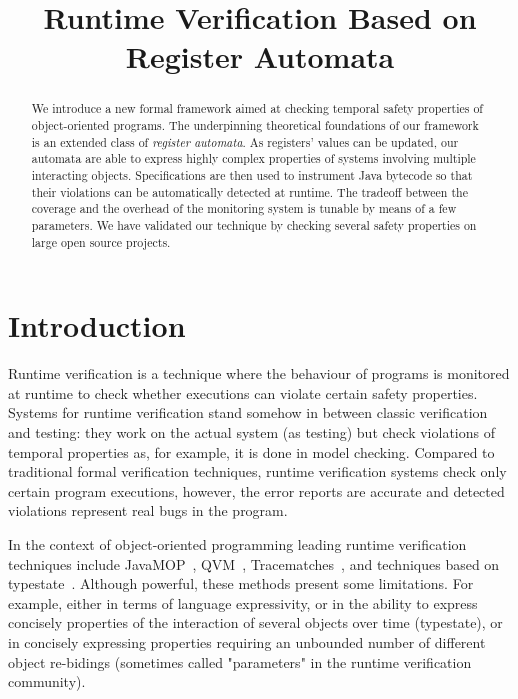 \documentclass[9pt, preprint]{sigplanconf} %
\title{Runtime Verification Based on Register Automata}
\theoremstyle{definition}
\theoremstyle{remark}
\begin{document}
\maketitle
\begin{abstract} %
We introduce a new formal framework aimed at checking temporal safety properties of object-oriented programs.
The underpinning theoretical foundations of our framework is an extended class of {\em register automata}.
As registers' values can be updated, our automata are able to express highly complex properties of systems involving multiple interacting objects.
Specifications are then used to instrument Java bytecode so that their violations can be automatically detected at runtime.
The tradeoff between the coverage and the overhead of the monitoring
system is tunable by means of a few parameters.
We have validated our technique by checking several safety properties on large open source projects.

\end{abstract}

\section{Introduction} %

Runtime verification is a technique where the behaviour of programs is monitored at runtime to check whether executions
can violate certain safety properties.
Systems for runtime verification stand somehow in between classic verification and testing: they work on the actual system (as testing) but check violations of temporal properties as, for example, it is done in model checking. Compared to traditional formal verification techniques, runtime verification systems check only certain program executions, however, the error reports are accurate and detected violations represent real bugs in the program.

In the context of object-oriented programming  leading runtime verification techniques include JavaMOP~\cite{dblp:journals/sttt/meredithjgcr12}, QVM~\cite{arnold:2008}, Tracematches~\cite{dblp:conf/oopsla/allanachklmsst05}, and techniques based on typestate~\cite{strom1986,dblp:conf/oopsla/bierhoffa07,dblp:conf/oopsla/naeeml08,disney2011,ball2002}. Although powerful,  these methods present some limitations. For example, either   in terms of  language expressivity, or in the ability to express concisely properties of the interaction of several objects 
over time (typestate), or in concisely expressing  properties requiring an unbounded number of different object re-bidings (sometimes called "parameters" in the runtime verification community).
\end{document}
